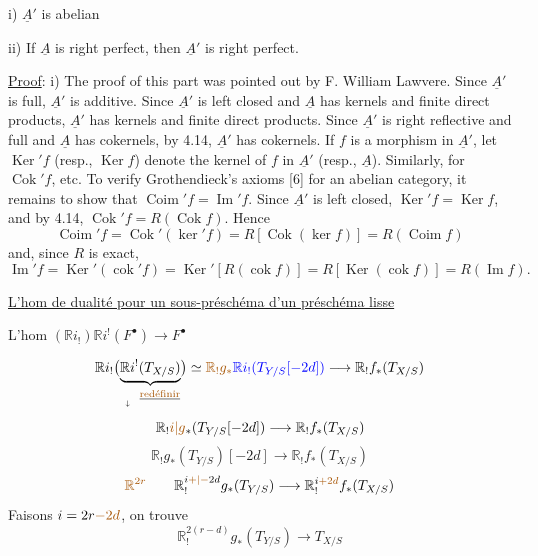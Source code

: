 i) $\underline A'$ is abelian

ii) If $\underline A$ is right perfect, then $\underline A'$ is right perfect.

\uline{Proof}: i) The proof of this part was pointed out by F. William Lawvere. Since $\underline A'$ is full, $\underline A'$ is additive. Since $\underline A'$ is left closed and $\underline A$ has kernels and finite direct products, $\underline A'$ has kernels and finite direct products. Since $\underline A'$ is right reflective and full and $\underline A$ has cokernels, by 4.14, $\underline A'$ has cokernels. If $f$ is a morphism in $\underline A'$, let $\operatorname{Ker}'f$ (resp., $\operatorname{Ker}f$) denote the kernel of $f$ in $\underline A'$ (resp., $\underline A$). Similarly, for $\operatorname{Cok}'f$, etc.
To verify Grothendieck's axioms [6] for an abelian category, it remains to show that $\operatorname{Coim}'f=\operatorname{Im}'f$. Since $\underline A'$ is left closed, $\operatorname{Ker}'f=\operatorname{Ker}f$, and by 4.14, $\operatorname{Cok}'f=R(\operatorname{Cok}f)$. Hence
\[
\operatorname{Coim}'f=\operatorname{Cok}'(\operatorname{ker}'f)
=R[\operatorname{Cok}(\operatorname{ker}f)]=R(\operatorname{Coim}f)
\]
and, since $R$ is exact,
\[
\operatorname{Im}'f=\operatorname{Ker}'(\operatorname{cok}'f)
=\operatorname{Ker}'[R(\operatorname{cok}f)]
=R[\operatorname{Ker}(\operatorname{cok}f)]=R(\operatorname{Im}f).
\]

\uline{L'hom de dualité pour un sous-préschéma  d'un préschéma lisse}

L'hom $(\mathbb{R}i_!)\mathbb{R}i^!(F^\bullet)\longrightarrow F^\bullet$


\[
\mathbb{R}i_!\bigl(\underbrace{\mathbb{R}i^!(T_{X/S})}_{\underset{\downarrow}{\phantom{\mathbb{R}i^!}}\ \text{\uline{\unsure{redéfinir}}}}\bigr)
\simeq\deleted{\unsure{\mathbb{R}_!g_*}}
\inserted{\mathbb{R}i_!(T_{Y/S}[-2d])}
\longrightarrow \mathbb{R}_!f_*(T_{X/S})
\]
\[
\mathbb{R}_!\unsure{i|g}_*(T_{Y/S}[-2d])\longrightarrow \mathbb{R}_!f_*(T_{X/S})
\]
\[
\mathbb{R}_!g_*(T_{Y/S})[-2d]\longrightarrow \mathbb{R}_!f_*(T_{X/S})
\]
\[
\deleted{\unsure{\mathbb{R}^{2r}}}\qquad
\mathbb{R}_!^{i\unsure{+|-}2d}g_*(T_{Y/S})\longrightarrow
\mathbb{R}_!^{i\deleted{\unsure{+2d}}}f_*(T_{X/S})
\]
Faisons $i=2r\deleted{\unsure{-2d}}$, on trouve \unsure{)}
\[
\mathbb{R}_!^{2(r-d)}g_*(T_{Y/S})\longrightarrow T_{X/S}
\]

